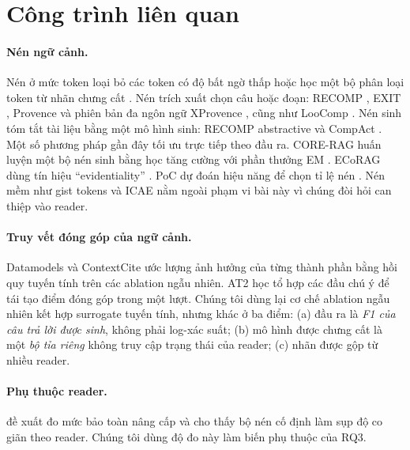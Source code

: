 \documentclass[11pt]{article}
\begin{document}
\section{Công trình liên quan}
\label{sec:related}

\paragraph{Nén ngữ cảnh.} Nén ở mức token loại bỏ các token có độ bất ngờ thấp
\citep{li2023selectivecontext,jiang2023llmlingua,jiang2024longllmlingua} hoặc học
một bộ phân loại token từ nhãn chưng cất \citep{pan2024llmlingua2}. Nén trích xuất
chọn câu hoặc đoạn: RECOMP \citep{xu2024recomp}, EXIT \citep{hwang2025exit},
Provence \citep{chirkova2025provence} và phiên bản đa ngôn ngữ XProvence
\citep{xprovence2026}, cũng như LooComp \citep{looComp2026}. Nén sinh tóm tắt tài
liệu bằng một mô hình sinh: RECOMP abstractive và CompAct \citep{yoon2024compact}. Một số phương pháp
gần đây tối ưu trực tiếp theo đầu ra. CORE-RAG huấn luyện một bộ nén sinh bằng
học tăng cường với phần thưởng EM \citep{coreRag2026}. ECoRAG dùng tín hiệu
``evidentiality'' \citep{ecorag2025}. PoC dự đoán hiệu năng để chọn tỉ lệ nén
\citep{poc2026}. Nén mềm như gist tokens và ICAE \citep{mu2023gist,ge2024icae}
nằm ngoài phạm vi bài này vì chúng đòi hỏi can thiệp vào reader.

\paragraph{Truy vết đóng góp của ngữ cảnh.} Datamodels \citep{ilyas2022datamodels} và
ContextCite \citep{cohenwang2024contextcite} ước lượng ảnh hưởng của từng thành
phần bằng hồi quy tuyến tính trên các ablation ngẫu nhiên. AT2
\citep{cohenwang2025at2} học tổ hợp các đầu chú ý để tái tạo điểm đóng góp
trong một lượt. Chúng tôi dùng lại cơ chế ablation ngẫu nhiên kết hợp surrogate
tuyến tính, nhưng khác ở ba điểm: (a) đầu ra là \emph{F1 của câu trả lời được
sinh}, không phải log-xác suất; (b) mô hình được chưng cất là một \emph{bộ tỉa riêng}
không truy cập trạng thái của reader; (c) nhãn được gộp từ nhiều reader.

\paragraph{Phụ thuộc reader.} \citet{readerScaling2026} đề xuất đo mức bảo toàn
nâng cấp và cho thấy bộ nén cố định làm sụp độ co giãn theo reader. Chúng tôi dùng
độ đo này làm biến phụ thuộc của RQ3.
\end{document}

